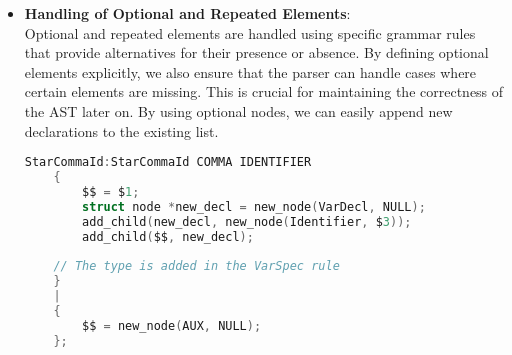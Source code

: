 \documentclass[12pt]{article}
\begin{document}
    \begin{itemize}
        \item \textbf{Handling of Optional and Repeated Elements}: \\ Optional and repeated elements are handled using specific grammar rules that provide alternatives for their presence or absence.
            By defining optional elements explicitly, we also ensure that the parser can handle cases where certain elements are missing. This is crucial for maintaining the correctness of the AST later on.
            By using optional nodes, we can easily append new declarations to the existing list.
            \begin{center}
                \begin{lstlisting}[language=C, caption={StarCommaId Rule}, basicstyle=\small\ttfamily]
StarCommaId:StarCommaId COMMA IDENTIFIER
    {
        $$ = $1;
        struct node *new_decl = new_node(VarDecl, NULL);
        add_child(new_decl, new_node(Identifier, $3));
        add_child($$, new_decl);
    
    // The type is added in the VarSpec rule
    }
    |   
    {   
        $$ = new_node(AUX, NULL);
    };
                \end{lstlisting}
            \end{center}


\end{itemize}
\end{document}
